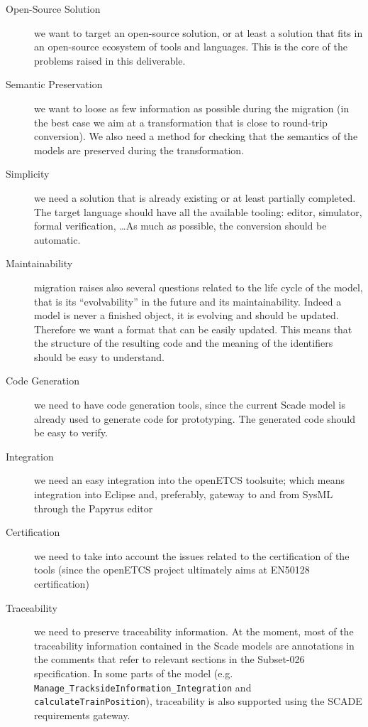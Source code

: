 \documentclass{template/openetcs_report}
\begin{document}
\begin{description}

\item[Open-Source Solution] we want to target an open-source solution,
  or at least a solution that fits in an open-source ecosystem of
  tools and languages. This is the core of the problems raised in this
  deliverable.

\item[Semantic Preservation] we want to loose as few information as
  possible during the migration (in the best case we aim at a
  transformation that is close to round-trip conversion). We also need
  a method for checking that the semantics of the models are preserved
  during the transformation.

\item[Simplicity] we need a solution that is already existing or at
  least partially completed. The target language should have all the
  available tooling: editor, simulator, formal verification, \dots As
  much as possible, the conversion should be automatic.

\item[Maintainability] migration raises also several questions related
  to the life cycle of the model, that is its ``evolvability'' in the
  future and its maintainability. Indeed a model is never a finished
  object, it is evolving and should be updated. Therefore we want a
  format that can be easily updated. This means that the structure of
  the resulting code and the meaning of the identifiers should be easy
  to understand.

\item[Code Generation] we need to have code generation tools, since
  the current Scade model is already used to generate code for
  prototyping.  The generated code should be easy to verify.

\item[Integration] we need an easy integration into the openETCS
  toolsuite; which means integration into Eclipse and, preferably,
  gateway to and from SysML through the Papyrus editor

\item[Certification] we need to take into account the issues related
  to the certification of the tools (since the openETCS project
  ultimately aims at EN50128 certification)

\item[Traceability] we need to preserve traceability information. At
  the moment, most of the traceability information contained in the
  Scade models are annotations in the comments that refer to relevant
  sections in the Subset-026 specification. In some parts of the model
  (e.g. \verb+Manage_TracksideInformation_Integration+ and
  \verb+calculateTrainPosition+), traceability is also supported using
  the SCADE requirements gateway.
\end{description}
\end{document}
